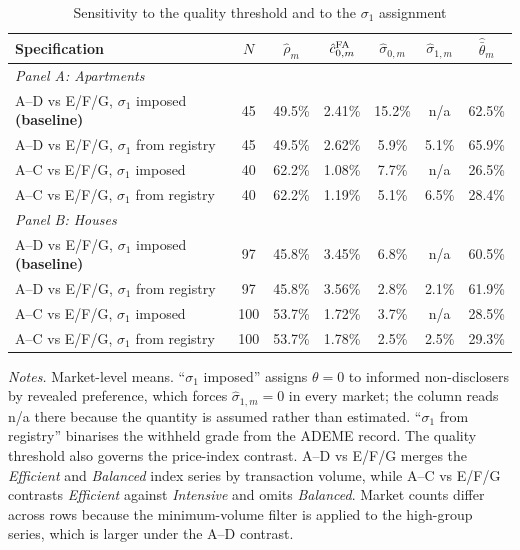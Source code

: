 \begin{table}[htbp]
\centering
\caption{Sensitivity to the quality threshold and to the $\sigma_1$ assignment}
\label{tab:robustness}
\small\renewcommand{\arraystretch}{1.25}
\begin{tabular*}{\textwidth}{@{\extracolsep{\fill}}l*{6}{c}@{}}
\toprule\toprule
\textbf{Specification} & $N$ & $\hat\rho_m$ & $\hat c_{0,m}^{\rm FA}$ & $\hat\sigma_{0,m}$ & $\hat\sigma_{1,m}$ & $\hat{\bar\theta}_m$ \\
\midrule
\multicolumn{7}{l}{\textit{Panel A: Apartments}} \\[2pt]
A--D vs E/F/G, $\sigma_1$ imposed \textbf{(baseline)} & 45 & 49.5\% & 2.41\% & 15.2\% & n/a & 62.5\% \\
A--D vs E/F/G, $\sigma_1$ from registry               & 45 & 49.5\% & 2.62\% &  5.9\% & 5.1\% & 65.9\% \\
A--C vs E/F/G, $\sigma_1$ imposed                     & 40 & 62.2\% & 1.08\% &  7.7\% & n/a & 26.5\% \\
A--C vs E/F/G, $\sigma_1$ from registry               & 40 & 62.2\% & 1.19\% &  5.1\% & 6.5\% & 28.4\% \\
\midrule
\multicolumn{7}{l}{\textit{Panel B: Houses}} \\[2pt]
A--D vs E/F/G, $\sigma_1$ imposed \textbf{(baseline)} & 97 & 45.8\% & 3.45\% &  6.8\% & n/a & 60.5\% \\
A--D vs E/F/G, $\sigma_1$ from registry               & 97 & 45.8\% & 3.56\% &  2.8\% & 2.1\% & 61.9\% \\
A--C vs E/F/G, $\sigma_1$ imposed                     & 100 & 53.7\% & 1.72\% &  3.7\% & n/a & 28.5\% \\
A--C vs E/F/G, $\sigma_1$ from registry               & 100 & 53.7\% & 1.78\% &  2.5\% & 2.5\% & 29.3\% \\
\bottomrule\bottomrule
\end{tabular*}
\vspace{0.5em}
\begin{minipage}{\linewidth}
\footnotesize\textit{Notes.} Market-level means. ``$\sigma_1$ imposed'' assigns $\theta=0$ to
informed non-disclosers by revealed preference, which forces $\hat\sigma_{1,m}=0$ in every
market; the column reads n/a there because the quantity is assumed rather than estimated.
``$\sigma_1$ from registry'' binarises the withheld grade from the ADEME record. The quality
threshold also governs the price-index contrast. A--D vs E/F/G merges the \emph{Efficient} and
\emph{Balanced} index series by transaction volume, while A--C vs E/F/G contrasts
\emph{Efficient} against \emph{Intensive} and omits \emph{Balanced}. Market counts differ
across rows because the minimum-volume filter is applied to the high-group series, which is
larger under the A--D contrast.
\end{minipage}
\end{table}

